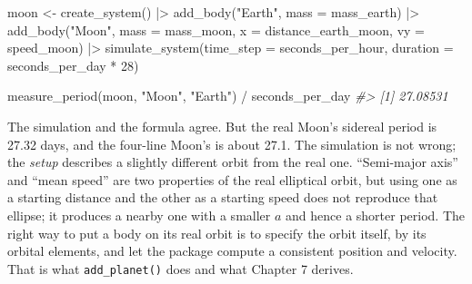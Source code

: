 \documentclass[
  10.5pt,
  letterpaper,
]{scrbook}
\newenvironment{Shaded}{\begin{snugshade}}{\end{snugshade}}
\newcommand{\AttributeTok}[1]{\textcolor[rgb]{0.00,0.00,0.00}{#1}}
\newcommand{\CommentTok}[1]{\textcolor[rgb]{0.00,0.00,0.00}{\textit{#1}}}
\newcommand{\DecValTok}[1]{\textcolor[rgb]{0.00,0.00,0.00}{#1}}
\newcommand{\FunctionTok}[1]{\textcolor[rgb]{0.00,0.00,0.00}{#1}}
\newcommand{\NormalTok}[1]{\textcolor[rgb]{0.00,0.00,0.00}{#1}}
\newcommand{\OtherTok}[1]{\textcolor[rgb]{0.00,0.00,0.00}{#1}}
\newcommand{\SpecialCharTok}[1]{\textcolor[rgb]{0.00,0.00,0.00}{#1}}
\newcommand{\StringTok}[1]{\textcolor[rgb]{0.00,0.00,0.00}{#1}}
\theoremstyle{definition}
\theoremstyle{plain}
\theoremstyle{remark}
\begin{document}
\begin{Shaded}
\begin{Highlighting}[]
\NormalTok{moon }\OtherTok{\textless{}{-}} \FunctionTok{create\_system}\NormalTok{() }\SpecialCharTok{|\textgreater{}}
  \FunctionTok{add\_body}\NormalTok{(}\StringTok{"Earth"}\NormalTok{, }\AttributeTok{mass =}\NormalTok{ mass\_earth) }\SpecialCharTok{|\textgreater{}}
  \FunctionTok{add\_body}\NormalTok{(}\StringTok{"Moon"}\NormalTok{,  }\AttributeTok{mass =}\NormalTok{ mass\_moon, }\AttributeTok{x =}\NormalTok{ distance\_earth\_moon, }\AttributeTok{vy =}\NormalTok{ speed\_moon) }\SpecialCharTok{|\textgreater{}}
  \FunctionTok{simulate\_system}\NormalTok{(}\AttributeTok{time\_step =}\NormalTok{ seconds\_per\_hour, }\AttributeTok{duration =}\NormalTok{ seconds\_per\_day }\SpecialCharTok{*} \DecValTok{28}\NormalTok{)}

\FunctionTok{measure\_period}\NormalTok{(moon, }\StringTok{"Moon"}\NormalTok{, }\StringTok{"Earth"}\NormalTok{) }\SpecialCharTok{/}\NormalTok{ seconds\_per\_day}
\CommentTok{\#\textgreater{} [1] 27.08531}
\end{Highlighting}
\end{Shaded}

The simulation and the formula agree. But the real Moon's sidereal
period is 27.32 days, and the four-line Moon's is about 27.1. The
simulation is not wrong; the \emph{setup} describes a slightly different
orbit from the real one. ``Semi-major axis'' and ``mean speed'' are two
properties of the real elliptical orbit, but using one as a starting
distance and the other as a starting speed does not reproduce that
ellipse; it produces a nearby one with a smaller \(a\) and hence a
shorter period. The right way to put a body on its real orbit is to
specify the orbit itself, by its orbital elements, and let the package
compute a consistent position and velocity. That is what
\texttt{add\_planet()} does and what Chapter 7 derives.
\end{document}
